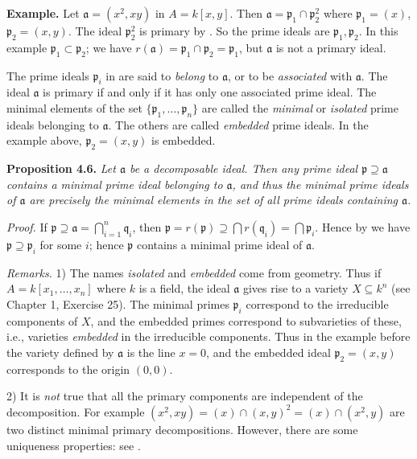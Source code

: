 \noindent\textbf{Example.} Let \(\mathfrak a=(x^2,xy)\) in \(A=k[x,y]\). Then \(\mathfrak a=\mathfrak p_1\cap\mathfrak p_2^2\) where \(\mathfrak p_1=(x)\), \(\mathfrak p_2=(x,y)\). The ideal \(\mathfrak p_2^2\) is primary by . So the prime ideals are \(\mathfrak p_1,\mathfrak p_2\). In this example \(\mathfrak p_1\subset\mathfrak p_2\); we have \(r(\mathfrak a)=\mathfrak p_1\cap\mathfrak p_2=\mathfrak p_1\), but \(\mathfrak a\) is not a primary ideal.

The prime ideals \(\mathfrak p_i\) in  are said to \emph{belong} to \(\mathfrak a\), or to be \emph{associated} with \(\mathfrak a\). The ideal \(\mathfrak a\) is primary if and only if it has only one associated prime ideal. The minimal elements of the set \(\{\mathfrak p_1,\ldots,\mathfrak p_n\}\) are called the \emph{minimal} or \emph{isolated} prime ideals belonging to \(\mathfrak a\). The others are called \emph{embedded} prime ideals. In the example above, \(\mathfrak p_2=(x,y)\) is embedded.

\noindent\textbf{Proposition 4.6.} \emph{Let \(\mathfrak a\) be a decomposable ideal. Then any prime ideal \(\mathfrak p\supseteq\mathfrak a\) contains a minimal prime ideal belonging to \(\mathfrak a\), and thus the minimal prime ideals of \(\mathfrak a\) are precisely the minimal elements in the set of all prime ideals containing \(\mathfrak a\).}

\noindent\emph{Proof.} If \(\mathfrak p\supseteq\mathfrak a=\bigcap_{i=1}^n\mathfrak q_i\), then \(\mathfrak p=r(\mathfrak p)\supseteq\bigcap r(\mathfrak q_i)=\bigcap\mathfrak p_i\). Hence by  we have \(\mathfrak p\supseteq\mathfrak p_i\) for some \(i\); hence \(\mathfrak p\) contains a minimal prime ideal of \(\mathfrak a\). \proofbox

\noindent\emph{Remarks.} 1) The names \emph{isolated} and \emph{embedded} come from geometry. Thus if \(A=k[x_1,\ldots,x_n]\) where \(k\) is a field, the ideal \(\mathfrak a\) gives rise to a variety \(X\subseteq k^n\) (see Chapter 1, Exercise 25). The minimal primes \(\mathfrak p_i\) correspond to the irreducible components of \(X\), and the embedded primes correspond to subvarieties of these, i.e., varieties \emph{embedded} in the irreducible components. Thus in the example before  the variety defined by \(\mathfrak a\) is the line \(x=0\), and the embedded ideal \(\mathfrak p_2=(x,y)\) corresponds to the origin \((0,0)\).

2) It is \emph{not} true that all the primary components are independent of the decomposition. For example \((x^2,xy)=(x)\cap(x,y)^2=(x)\cap(x^2,y)\) are two distinct minimal primary decompositions. However, there are some uniqueness properties: see .

